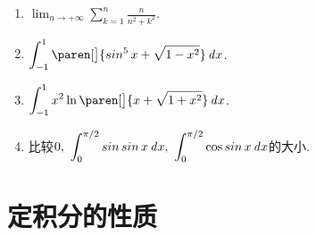 \documentclass[a4paper,punct=CCT]{ctexbook}
\theoremstyle{definition}
\theoremstyle{remark}
\newif\ifshowsol
\let\leq\leqslant
\let\le\leq
\let\geq\geqslant
\let\ge\geq}
\begin{document}
\begin{enumerate}
  \ifshowsol
  因为\(f(x)\)是\((0,+\infty)\)上的单调减函数, 所以易知对于任意\(k \ge 1\)都有
  \[
    \int_k^{k+1} f(x) \dx \le f(k) \le \int_{k-1}^k f(x) \dx.
  \]
  那么
  \[
    \int_1^{n+1} f(x) \dx \le \sum_{k=1}^n f(k) \le \int_0^n f(x) \dx, \quad
    \int_2^{n+1} f(x) \dx \le \sum_{k=2}^n f(k) \le \int_1^n f(x) \dx.
  \]
  然后有
  \[
    \int_1^{n+1} f(x) \dx \le \sum_{k=1}^n f(k) = f(1) + \sum_{k=2}^n f(k) \le f(1) + \int_1^n f(x) \dx.
  \]
  \fi

\item \(\displaystyle \lim_{n\to+\infty} \sum_{k=1}^n \frac{n}{n^2+k^2} \).

  \ifshowsol
  将这个和变形得到
  \[
    \sum_{k=1}^n \frac{n}{n^2+k^2}
    = \sum_{k=1}^n \frac1n \frac{1}{1+\paren[\big]{\frac{k}{n}}^2}.
  \]
  这实际上就是函数\(\frac{1}{1+x^2}\)在\([0,1]\)上的一个下和．那么
  \[
    \lim_{n\to+\infty} \sum_{k=1}^n \frac{n}{n^2+k^2} = \int_0^1 \frac{\dx}{1+x^2} = \frac{\pi}{4}.
  \]
  \fi

\item \(\displaystyle \int_{-1}^1 \paren[\big]{\sin^5 x + \sqrt{1 - x^2}} \dx\).

  \ifshowsol
  将被积函数分解成一个奇函数和一个偶函数, 积分区间是\([-1,1]\), 奇函数抵消掉变成零, 偶函数变成
  \[
    \int_{-1}^1 \paren[\big]{\sin^5 x + \sqrt{1 - x^2}} \dx
    = \int_{-1}^1 \sin^5 x \dx + 2 \int_0^1 \sqrt{1-x^2} \dx
    = \frac{\pi}{2}.
  \]
  \fi

\item \(\displaystyle \int_{-1}^1 x^2 \ln\paren[\big]{x + \sqrt{1 + x^2}} \dx\).

  \ifshowsol
  因为\(\ln\paren[\big]{x + \sqrt{1 + x^2}} = \arcsinh x\)是一个奇函数, \(x^2\)是一个偶函数, 所以他们的乘积还是一个奇函数．因此
  \[
    \int_{-1}^1 x^2 \ln\paren[\big]{x + \sqrt{1 + x^2}} \dx = 0.
  \]
  \fi

\item 比较\(\displaystyle 0,\ \int_0^{\pi/2} \operatorname{\smash{sin}}\operatorname{\smash{sin}} x \mathop{}\!\mathit{d} x,\ \int_0^{\pi/2} \cos\operatorname{\smash{sin}} x \mathop{}\!\mathit{d} x\)的大小.
\end{enumerate}
\fi

\section{定积分的性质}
\end{document}
